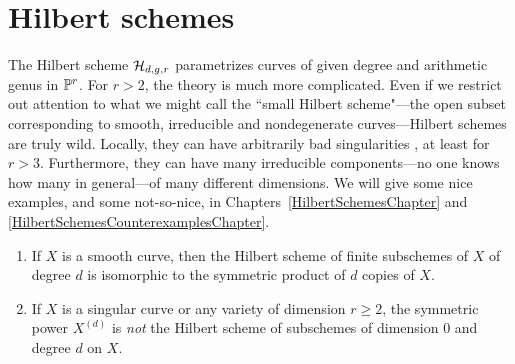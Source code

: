 \section{Hilbert schemes}\label{hilbert scheme section}

The Hilbert scheme $\cH_{d,g,r}$ parametrizes curves of given degree and arithmetic genus in $\PP^r$. For $r>2$, the theory is much more complicated.  Even if we restrict out attention to  what we might call the ``small Hilbert scheme"---the open subset corresponding to smooth, irreducible and nondegenerate curves---Hilbert schemes are truly wild. Locally, they can have arbitrarily bad singularities \cite{MR2227692}, at least for $r>3$. Furthermore, they can have many irreducible components---no one knows how many in general---of many different dimensions. We will give some nice examples, and some not-so-nice, in Chapters~\ref{HilbertSchemesChapter} and \ref{HilbertSchemesCounterexamplesChapter}.

\begin{exercise}\label{symmetric power vs Hilbert scheme}
\begin{enumerate}
 \item If $X$ is a smooth curve, then the Hilbert scheme of finite subschemes of $X$ of degree $d$ is
 isomorphic to the symmetric product of $d$ copies of $X$.
 \item If $X$ is a singular curve or any variety of dimension $r \geq 2$, the symmetric power $X^{(d)}$ is \emph{not} the Hilbert scheme of subschemes of dimension 0 and degree $d$ on $X$. 
\end{enumerate}
 \end{exercise}

%
%
%
%



